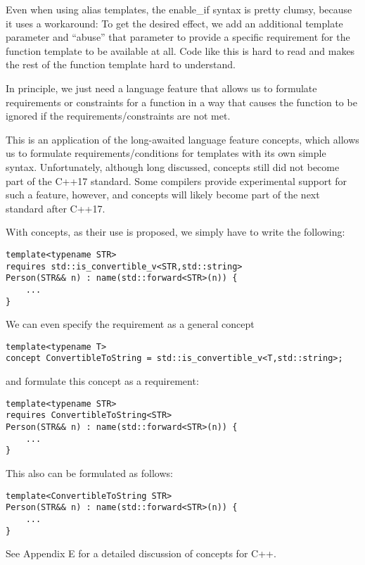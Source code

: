 Even when using alias templates, the enable\_if syntax is pretty clumsy, because it uses a workaround: To get the desired effect, we add an additional template parameter and “abuse” that parameter to provide a specific requirement for the function template to be available at all. Code like this is hard to read and makes the rest of the function template hard to understand.

In principle, we just need a language feature that allows us to formulate requirements or constraints for a function in a way that causes the function to be ignored if the requirements/constraints are not met.

This is an application of the long-awaited language feature concepts, which allows us to formulate requirements/conditions for templates with its own simple syntax. Unfortunately, although long discussed, concepts still did not become part of the C++17 standard. Some compilers provide experimental support for such a feature, however, and concepts will likely become part of the next standard after C++17.

With concepts, as their use is proposed, we simply have to write the following:

\begin{lstlisting}[style=styleCXX]
template<typename STR>
requires std::is_convertible_v<STR,std::string>
Person(STR&& n) : name(std::forward<STR>(n)) {
	...
}
\end{lstlisting}

We can even specify the requirement as a general concept

\begin{lstlisting}[style=styleCXX]
template<typename T>
concept ConvertibleToString = std::is_convertible_v<T,std::string>;
\end{lstlisting}

and formulate this concept as a requirement:

\begin{lstlisting}[style=styleCXX]
template<typename STR>
requires ConvertibleToString<STR>
Person(STR&& n) : name(std::forward<STR>(n)) {
	...
}
\end{lstlisting}

This also can be formulated as follows:

\begin{lstlisting}[style=styleCXX]
template<ConvertibleToString STR>
Person(STR&& n) : name(std::forward<STR>(n)) {
	...
}
\end{lstlisting}

See Appendix E for a detailed discussion of concepts for C++.




















